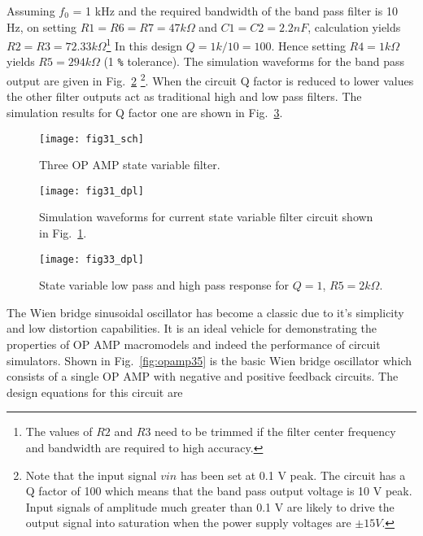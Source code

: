 Assuming $f_{0}$ = 1 kHz and the required bandwidth of the band pass filter is 10 Hz, on setting $R1 = R6 = R7 = 47 k\Omega$ and $C1 = C2 = 2.2 nF$, calculation yields $R2 = R3 = 72.33 k\Omega$\footnote{The values of $R2$ and $R3$ need to be trimmed if the filter center frequency and bandwidth are required to high accuracy.}  In this design $Q = 1k/10 = 100$.  Hence setting $R4 = 1k\Omega$ yields $R5 = 294k\Omega$ (1 \verb|%| tolerance). The simulation waveforms for the band pass output are given in Fig.~\ref{fig:opamp32} \footnote{Note that the input signal $vin$ has been set at 0.1 V peak.  The circuit has a Q factor of 100 which means that the band pass output voltage is 10 V peak. Input signals of amplitude much greater than 0.1 V are likely to drive the output signal into saturation when the power supply voltages are $\pm15 V$.}.  When the circuit Q factor is reduced to lower values the other filter outputs act as traditional high and low pass filters. The simulation results for Q factor one are shown in Fig.~\ref{fig:opamp33}.
\begin{figure}
  \centering
  \texttt{[image: fig31\_sch]} 
  \caption{Three OP AMP state variable filter.} 
  \label{fig:opamp31}
\end{figure}

\begin{figure}
  \centering
  \texttt{[image: fig31\_dpl]}
  \caption{Simulation waveforms for current state variable filter circuit shown in Fig.~\ref{fig:opamp31}.} 
  \label{fig:opamp32}
\end{figure}

\begin{figure}
  \centering
  \texttt{[image: fig33\_dpl]}
  \caption{State variable low pass and high pass response for $Q = 1$, $R5 = 2k\Omega$.} 
  \label{fig:opamp33}
\end{figure}


The Wien bridge sinusoidal oscillator has become a classic due to it's simplicity and low distortion capabilities.  It is an ideal vehicle for demonstrating the properties of OP AMP macromodels and indeed the performance of circuit simulators. Shown in Fig.~\ref{fig:opamp35} is the basic Wien bridge oscillator which consists of a single OP AMP with negative and positive feedback circuits. The design equations for this circuit are

